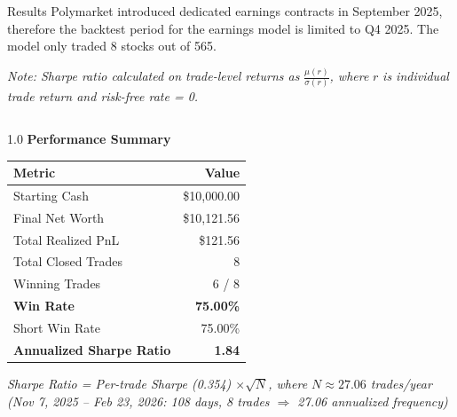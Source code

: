 \documentclass[final]{beamer}
\newlength{\colwidth}
\begin{document}
\begin{frame}[t]
\begin{columns}[t]
\begin{column}{\colwidth}
  \begin{block}{Results}
    Polymarket introduced dedicated earnings contracts in September 2025, therefore the backtest period for the earnings model is limited to Q4 2025. The model only traded 8 stocks out of 565. 
    
    \small{\textit{Note: Sharpe ratio calculated on trade-level returns as } $\frac{\mu(r)}{\sigma(r)}$\textit{, where } $r$ \textit{is individual trade return and risk-free rate = 0.}} 

    \begin{columns}[t]
      \begin{column}{1.0\linewidth}
         \textbf{Performance Summary}
          \begin{table}
            \centering
            \begin{tabular}{l r}
              \toprule
              \textbf{Metric} & \textbf{Value} \\
              \midrule
              Starting Cash & \$10,000.00 \\
              Final Net Worth & \$10,121.56 \\
              Total Realized PnL & \$121.56 \\
              Total Closed Trades & 8 \\
              Winning Trades & 6 / 8 \\
              \textbf{Win Rate} & \textbf{75.00\%} \\
              Short Win Rate & 75.00\% \\
              \textbf{Annualized Sharpe Ratio} & \textbf{1.84} \\
              \bottomrule
            \end{tabular}
          \end{table}
          \vspace{0.1cm}
          \small{\textit{Sharpe Ratio = Per-trade Sharpe (0.354) $\times \sqrt{N}$, where $N \approx 27.06$ trades/year}}
          \small{\textit{(Nov 7, 2025 -- Feb 23, 2026: 108 days, 8 trades $\Rightarrow$ 27.06 annualized frequency)}}
        \end{column}


\end{columns}
\end{block}
\end{column}
\end{columns}
\end{frame}
\end{document}

